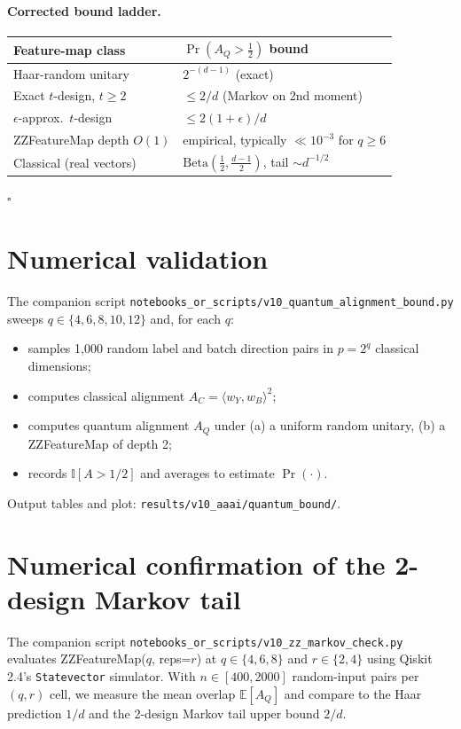 \documentclass[11pt,a4paper]{article}
\newcommand{\E}{\mathbb{E}}
\begin{document}
\paragraph{Corrected bound ladder.}
\begin{center}
\begin{tabular}{ll}
\toprule
Feature-map class & $\Pr(A_Q>\tfrac12)$ bound \\
\midrule
Haar-random unitary               & $2^{-(d-1)}$ (exact) \\
Exact $t$-design, $t\ge 2$        & $\le 2/d$  (Markov on 2nd moment) \\
$\epsilon$-approx.\ $t$-design    & $\le 2(1+\epsilon)/d$ \\
ZZFeatureMap depth $O(1)$         & empirical, typically $\ll 10^{-3}$ for $q\ge 6$ \\
Classical (real vectors)          & $\mathrm{Beta}(\tfrac12,\tfrac{d-1}{2})$, tail $\sim d^{-1/2}$ \\
\bottomrule
\end{tabular}
\end{center}

\hfill$\square$

\section{Numerical validation}

The companion script
\texttt{notebooks\_or\_scripts/v10\_quantum\_alignment\_bound.py}
sweeps $q\in\{4,6,8,10,12\}$ and, for each $q$:
\begin{itemize}
\item samples 1{,}000 random label and batch direction pairs in
  $p=2^{q}$ classical dimensions;
\item computes classical alignment $A_C=\langle w_Y,w_B\rangle^{2}$;
\item computes quantum alignment $A_Q$ under (a) a uniform random
  unitary, (b) a ZZFeatureMap of depth 2;
\item records $\mathbb{I}[A>1/2]$ and averages to estimate
  $\Pr(\cdot)$.
\end{itemize}
Output tables and plot: \texttt{results/v10\_aaai/quantum\_bound/}.

\section{Numerical confirmation of the 2-design Markov tail}

The companion script
\texttt{notebooks\_or\_scripts/v10\_zz\_markov\_check.py} evaluates
ZZFeatureMap($q$, reps=$r$) at $q\in\{4,6,8\}$ and $r\in\{2,4\}$ using
Qiskit 2.4's \texttt{Statevector} simulator. With $n\in[400,2000]$
random-input pairs per $(q,r)$ cell, we measure the mean overlap
$\E[A_Q]$ and compare to the Haar prediction $1/d$ and the
2-design Markov tail upper bound $2/d$.
\end{document}
